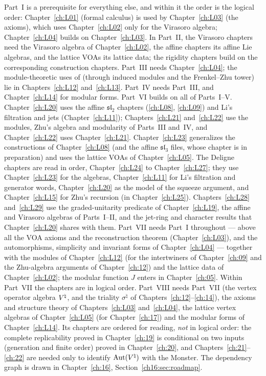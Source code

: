 Part~I is a prerequisite for everything else, and within it the order is the logical order:
Chapter~\ref{ch:L01} (formal calculus) is used by Chapter~\ref{ch:L03} (the axioms), which uses
Chapter~\ref{ch:L02} only for the Virasoro algebra; Chapter~\ref{ch:L04} builds on
Chapter~\ref{ch:L03}. In Part~II, the Virasoro chapters need the Virasoro algebra of
Chapter~\ref{ch:L02}, the affine chapters its affine Lie algebras, and the lattice VOAs its lattice
data; the rigidity chapters build on the corresponding construction chapters. Part~III needs
Chapter~\ref{ch:L04}; the module-theoretic uses of  (through induced modules and
the Frenkel--Zhu tower) lie in Chapters~\ref{ch:L12} and~\ref{ch:L13}.
Part~IV needs Part~III, and Chapter~\ref{ch:L14} for modular forms.
Part~VI builds on all of Parts~I--V. Chapter~\ref{ch:L20} uses the affine $\mathfrak{sl}_2$ chapters
(\ref{ch:L08}, \ref{ch:L09}) and Li's filtration and jets (Chapter~\ref{ch:L11}); Chapters~\ref{ch:L21}
and~\ref{ch:L22} use the modules, Zhu's algebra and modularity of Parts~III and~IV, and
Chapter~\ref{ch:L22} uses Chapter~\ref{ch:L21}. Chapter~\ref{ch:L23} generalizes the constructions of
Chapter~\ref{ch:L08} (and the affine $\mathfrak{sl}_3$ files, whose chapter is in preparation) and uses
the lattice VOAs of Chapter~\ref{ch:L05}. The Deligne
chapters are read in order, Chapter~\ref{ch:L24} to Chapter~\ref{ch:L27}; they use Chapter~\ref{ch:L23}
for the algebras, Chapter~\ref{ch:L11} for Li's filtration and generator words, Chapter~\ref{ch:L20} as
the model of the squeeze argument, and Chapter~\ref{ch:L15} for Zhu's recursion (in
Chapter~\ref{ch:L25}). Chapters~\ref{ch:L28} and~\ref{ch:L29} use the graded-unitarity
predicate of Chapter~\ref{ch:L19}, the affine and Virasoro algebras of Parts~I--II, and the jet-ring and character
results that Chapter~\ref{ch:L20} shares with them.
Part~VII needs Part~I throughout --- above all the VOA axioms and the
reconstruction theorem (Chapter~\ref{ch:L03}), and the automorphisms, simplicity and invariant
forms of Chapter~\ref{ch:L04} --- together with the modules of Chapter~\ref{ch:L12} (for the
intertwiners of Chapter~\ref{ch:09} and the Zhu-algebra arguments of Chapter~\ref{ch:12}) and the
lattice data of Chapter~\ref{ch:L02}; the modular function $J$ enters in Chapter~\ref{ch:05}. Within Part~VII the chapters
are in logical order.
Part~VIII needs Part~VII (the vertex operator algebra ${V^{\natural}}$, and the triality $\sigma^\natural$ of
Chapters~\ref{ch:12}--\ref{ch:14}), the axioms and structure theory of Chapters~\ref{ch:L03} and~\ref{ch:L04}, the
lattice vertex algebras of Chapter~\ref{ch:L05} (for Chapter~\ref{ch:17}) and the modular forms of
Chapter~\ref{ch:L14}. Its chapters are ordered for reading, \emph{not} in logical order: the complete replicability
proved in Chapter~\ref{ch:19} is conditional on two inputs (generation and finite order) proved in
Chapter~\ref{ch:20}, and Chapters~\ref{ch:21}--\ref{ch:22} are needed only to identify $\operatorname{Aut}({V^{\natural}})$ with the Monster.
The dependency graph is drawn in Chapter~\ref{ch:16}, Section~\ref{ch16:sec:roadmap}.

